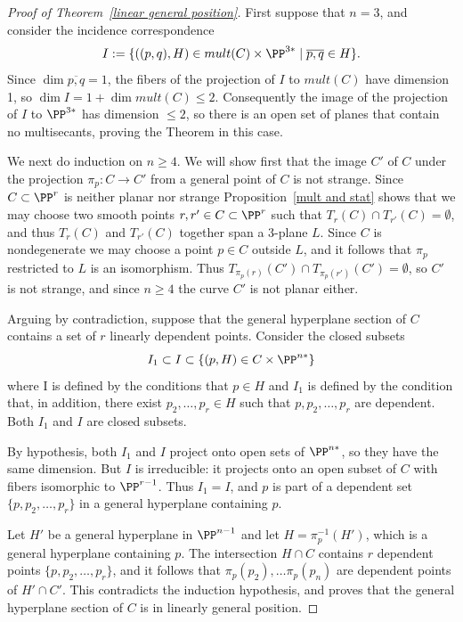 \begin{proof}[Proof of Theorem~\ref{linear general position}]
First suppose that $n=3$, and consider the incidence correspondence
$$
I := \{ ((p,q), H) \in mult(C) \times \PP^{3*} \mid \overline{p,q}\in H\}.
$$
Since $\dim \overline{p,q} = 1$, the fibers of the projection of $I$ to $mult(C)$ have dimension 1,
so $\dim I = 1+\dim mult(C)  \leq 2$. Consequently the image of  the projection of $I$ to $\PP^{3*}$ has
dimension $\leq 2$, so there is an open set of planes that contain no multisecants, proving the Theorem in this case.

We next do induction on $n\geq 4$. We will show first that the image $C'$ of
$C$ under the projection $\pi_p: C\to C'$ from a general point of $C$ is not strange. Since $C\subset \PP^r$ is neither
planar nor strange
Proposition~\ref{mult and stat} shows that we may choose two smooth points
$r,r'\in C\subset \PP^r$ such that $T_r(C)\cap T_{r'}(C) = \emptyset$, and thus 
$T_r(C)$ and $T_{r'}(C)$ together span a 3-plane $L$. Since $C$ is nondegenerate we may
choose a point $p\in C$ outside $L$, and it follows that $\pi_p$ restricted to $L$ is an isomorphism.
Thus $T_{\pi_p(r)}(C') \cap T_{\pi_p({r'})}(C') = \emptyset$, so $C'$ is not strange, 
and since $n\geq 4$ the curve $C'$ is not planar either.

Arguing by contradiction, suppose that the general hyperplane section of $C$ contains a set of $r$ linearly dependent points. Consider the closed subsets  
$$
I_1 \subset I \subset \{(p,H) \in C \times \PP^{n*}\}
$$
where I is defined by the conditions that $p\in H$ and $I_1$ is defined by the condition that, in addition, there exist $p_2,\dots, p_r\in H$
such that $p, p_2, \dots, p_r$ are dependent. Both $I_1$ and $I$ are closed subsets.

By hypothesis, both $I_1$ and $I$ project onto open sets of $\PP^{n*}$, so they have the same dimension.
But $I$ is irreducible: it projects onto an open subset of $C$ with fibers isomorphic to $\PP^{r-1}$. Thus $I_1 = I$,
and  $p$ is part of a dependent set
$\{p, p_2,\dots, p_r\}$ in a general hyperplane containing $p$.

Let $H'$ be a general hyperplane in $\PP^{n-1}$
and let $H = \pi_p^{-1}(H')$, which is a general hyperplane containing $p$. The intersection $H\cap C$
contains $r$ dependent points $\{p, p_2,\dots, p_r\}$, and it follows that $\pi_p(p_2),\dots \pi_p(p_n)$
are dependent points of $H'\cap C'$. This contradicts the induction hypothesis, and proves that
the general hyperplane section of $C$ is in linearly general position.
\end{proof}
 
